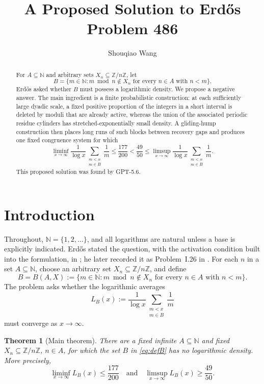 \documentclass[11pt]{article}
\title{A Proposed Solution to Erd\H{o}s Problem 486}
\author{Shouqiao Wang}
\affil{Columbia University\hspace{2.5em}Multiscalar Intelligence}
\date{}
\numberwithin{equation}{section}
\newtheorem{theorem}{Theorem}[section]
\theoremstyle{definition}
\theoremstyle{remark}
\newcommand{\N}{\mathbb N}
\newcommand{\Z}{\mathbb Z}
\begin{document}
\maketitle

\begin{abstract}
For \(A\subseteq\N\) and arbitrary sets
\(X_n\subseteq\Z/n\Z\), let
\[
B=\{m\in\N:m\bmod n\notin X_n
       \text{ for every }n\in A\text{ with }n<m\}.
\]
Erd\H{o}s asked whether \(B\) must possess a logarithmic density.  We
propose a negative answer.  The main ingredient is a finite probabilistic
construction: at each sufficiently large dyadic scale, a fixed positive
proportion of the integers in a short interval is deleted by moduli that are already active,
whereas the union of the associated periodic residue cylinders has
stretched-exponentially small density.  A gliding-hump construction then
places long runs of such blocks between recovery gaps and produces one
fixed congruence system for which
\[
\liminf_{x\to\infty}\frac1{\log x}
  \sum_{\substack{m<x\\m\in B}}\frac1m
\le\frac{177}{200}<\frac{49}{50}\le
\limsup_{x\to\infty}\frac1{\log x}
  \sum_{\substack{m<x\\m\in B}}\frac1m .
\]
This proposed solution was found by GPT-5.6.
\end{abstract}

\section{Introduction}

Throughout, \(\N=\{1,2,\ldots\}\), and all logarithms are natural unless a
base is explicitly indicated.  Erd\H{o}s stated the question, with
the activation condition built into the formulation, in
\cite[p.~48]{Er57}; he later recorded it as Problem~I.26 in
\cite[pp.~235--236]{Er61}.
For each \(n\) in a set \(A\subseteq\N\), choose an arbitrary set
\(X_n\subseteq\Z/n\Z\), and define
\begin{equation}\label{eq:defB}
B=B(A,X):=\{m\in\N:m\bmod n\notin X_n
      \text{ for every }n\in A\text{ with }n<m\}.
\end{equation}
The problem asks whether the logarithmic averages
\[
L_B(x):=\frac1{\log x}
   \sum_{\substack{m<x\\m\in B}}\frac1m
\]
must converge as \(x\to\infty\).

\begin{theorem}[Main theorem]\label{thm:main}
There are a fixed infinite \(A\subseteq\N\) and fixed
\(X_n\subseteq\Z/n\Z\), \(n\in A\), for which the set \(B\) in
\eqref{eq:defB} has no logarithmic density.  More precisely,
\[
\liminf_{x\to\infty}L_B(x)\le\frac{177}{200}
\quad\text{and}\quad
\limsup_{x\to\infty}L_B(x)\ge\frac{49}{50}.
\]
\end{theorem}
\end{document}
